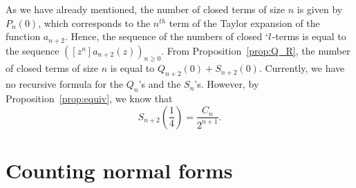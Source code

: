 \documentclass{jfp1}
\begin{document}
  As we have already mentioned, the number of closed terms of size $n$ is given by
  $P_n(0)$, which corresponds to the $n^{th}$ term of the Taylor expansion of the function
  $a_{n+2}$. Hence, the sequence of the numbers of closed $`l$-terms is equal to the
  sequence $\left( [z^n]a_{n+2}(z) \right)_{n \geq 0}$. From Proposition~\ref{prop:Q_R}, the
  number of closed terms of size $n$ is equal to $Q_{n+2}(0) + S_{n+2}(0)$.  Currently, we
  have no recursive formula for the $Q_n$'s and the $S_n$'s.  However, by Proposition~\ref{prop:equiv}, we know that
\[S_{n+2}\left(\frac{1}{4}\right) = \frac{C_{n}}{2^{n+1}}.\]

\section{Counting normal forms}
\label{sec:count-norm-forms}
\end{document}
